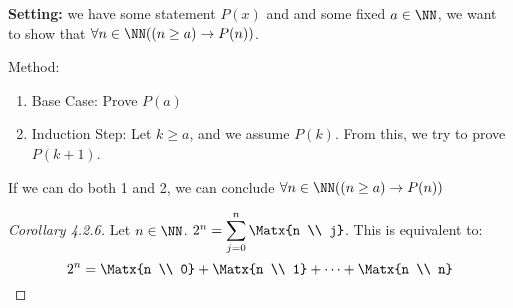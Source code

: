 \textbf{Setting:} we have some statement $P(x)$ and and some fixed $a \in \NN$, we want to show that $\forall n \in \NN ( (n \ge a) \to P(n) )$.
\begin{example}Method:
\begin{enumerate}
\item Base Case: Prove $P(a)$
\item Induction Step: Let $k \ge a$, and we assume $P(k)$. From this, we try to prove $P(k+1)$.
\end{enumerate}
If we can do both 1 and 2, we can conclude $\forall n \in \NN ( (n \ge a) \to P(n) )$
\end{example}
\begin{proof}[Corollary 4.2.6] Let $n \in \NN$. $2^n= \displaystyle\sum^n_{j=0} \Matx{n \\ j}$. This is equivalent to:
\[ 2^n = \Matx{n \\ 0}+\Matx{n \\ 1}+\cdots+\Matx{n \\ n} \]
\end{proof}
